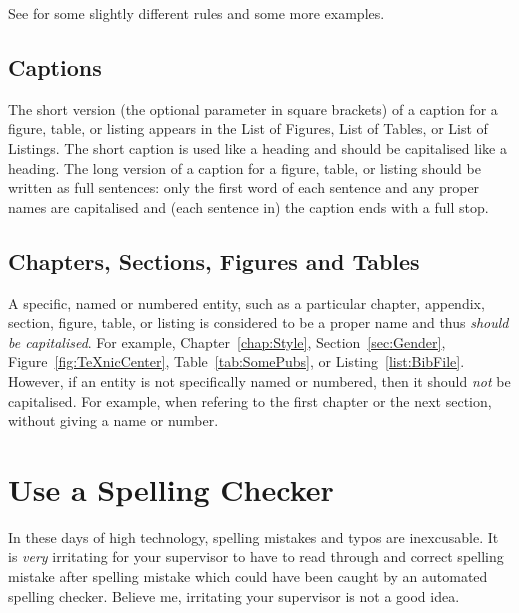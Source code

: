 See \textcite{WB-Capitalisation} for some slightly different rules and
some more examples.






\subsection{Captions}

The short version (the optional parameter in square brackets) of a
caption for a figure, table, or listing appears in the List of
Figures, List of Tables, or List of Listings. The short caption is
used like a heading and should be capitalised like a heading. The long
version of a caption for a figure, table, or listing should be written
as full sentences: only the first word of each sentence and any proper
names are capitalised and (each sentence in) the caption ends with a
full stop.




\subsection{Chapters, Sections, Figures and Tables}

A specific, named or numbered entity, such as a particular chapter,
appendix, section, figure, table, or listing is considered to be a
proper name and thus \emph{should be capitalised}. For example,
Chapter~\ref{chap:Style}, Section~\ref{sec:Gender},
Figure~\ref{fig:TeXnicCenter}, Table~\ref{tab:SomePubs}, or
Listing~\ref{list:BibFile}. However, if an entity is not specifically
named or numbered, then it should \emph{not} be capitalised. For
example, when refering to the first chapter or the next section,
without giving a name or number.








\section{Use a Spelling Checker}

In these days of high technology, spelling mistakes and typos are
inexcusable. It is \emph{very} irritating for your supervisor to have
to read through and correct spelling mistake after spelling mistake
which could have been caught by an automated spelling checker.
Believe me, irritating your supervisor is not a good idea.

